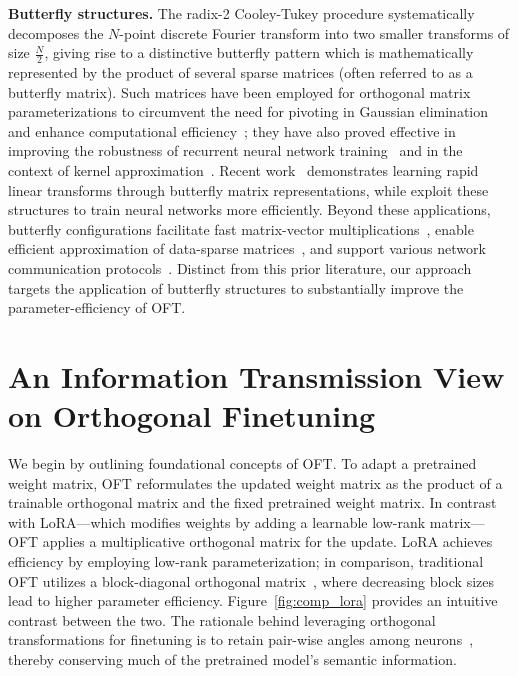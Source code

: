 \textbf{Butterfly structures.} The radix-2 Cooley-Tukey procedure systematically decomposes the $N$-point discrete Fourier transform into two smaller transforms of size $\frac{N}{2}$, giving rise to a distinctive butterfly pattern which is mathematically represented by the product of several sparse matrices (often referred to as a butterfly matrix). Such matrices have been employed for orthogonal matrix parameterizations to circumvent the need for pivoting in Gaussian elimination and enhance computational efficiency~\cite{parker1995random}; they have also proved effective in improving the robustness of recurrent neural network training~\cite{jing2017tunable} and in the context of kernel approximation~\cite{munkhoeva2018quadrature}. Recent work~\cite{dao2019learning,dao2019kaleidoscope} demonstrates learning rapid linear transforms through butterfly matrix representations, while \cite{chen2022pixelated,dao2022monarch} exploit these structures to train neural networks more efficiently. Beyond these applications, butterfly configurations facilitate fast matrix-vector multiplications~\cite{michielssen1996multilevel,o2010algorithm}, enable efficient approximation of data-sparse matrices~\cite{li2015butterfly}, and support various network communication protocols~\cite{klasing1994broadcasting,li2003linear,rajasingh2016transmission}. Distinct from this prior literature, our approach targets the application of butterfly structures to substantially improve the parameter-efficiency of OFT.

\section{An Information Transmission View on Orthogonal Finetuning}

We begin by outlining foundational concepts of OFT. To adapt a pretrained weight matrix, OFT reformulates the updated weight matrix as the product of a trainable orthogonal matrix and the fixed pretrained weight matrix. In contrast with LoRA—which modifies weights by adding a learnable low-rank matrix—OFT applies a multiplicative orthogonal matrix for the update. LoRA achieves efficiency by employing low-rank parameterization; in comparison, traditional OFT utilizes a block-diagonal orthogonal matrix~\cite{qiu2023controlling}, where decreasing block sizes lead to higher parameter efficiency. Figure~\ref{fig:comp_lora} provides an intuitive contrast between the two. The rationale behind leveraging orthogonal transformations for finetuning is to retain pair-wise angles among neurons~\cite{liu2018learning,liu2021orthogonal,qiu2023controlling}, thereby conserving much of the pretrained model’s semantic information.

